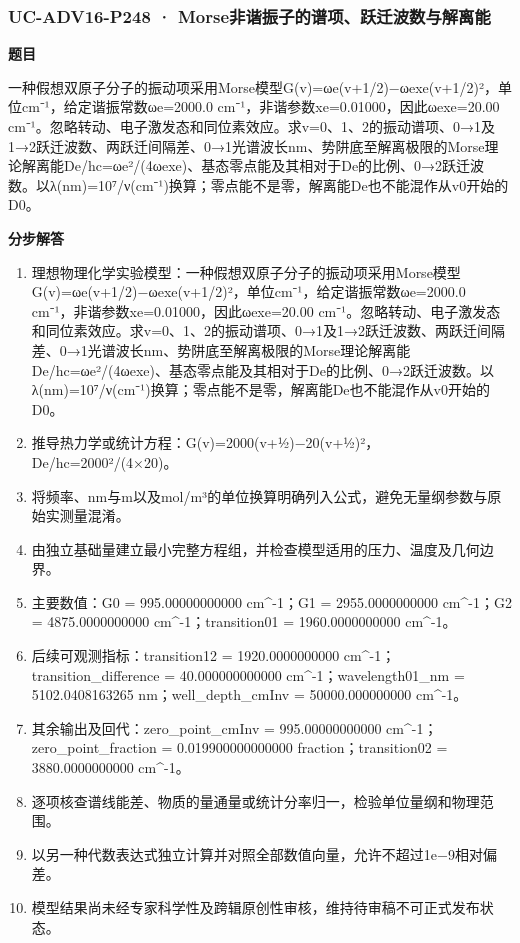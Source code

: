 \documentclass[UTF8,11pt,a4paper]{ctexart}
\begin{document}
\subsubsection*{UC-ADV16-P248 · Morse非谐振子的谱项、跃迁波数与解离能}
\noindent\textbf{题目}\par
一种假想双原子分子的振动项采用Morse模型G(v)=ωe(v+1/2)−ωexe(v+1/2)²，单位cm⁻¹，给定谐振常数ωe=2000.0 cm⁻¹，非谐参数xe=0.01000，因此ωexe=20.00 cm⁻¹。忽略转动、电子激发态和同位素效应。求v=0、1、2的振动谱项、0→1及1→2跃迁波数、两跃迁间隔差、0→1光谱波长nm、势阱底至解离极限的Morse理论解离能De/hc=ωe²/(4ωexe)、基态零点能及其相对于De的比例、0→2跃迁波数。以λ(nm)=10⁷/ν(cm⁻¹)换算；零点能不是零，解离能De也不能混作从v0开始的D0。\par
\medskip\noindent\textbf{分步解答}
\begin{enumerate}
\item 理想物理化学实验模型：一种假想双原子分子的振动项采用Morse模型G(v)=ωe(v+1/2)−ωexe(v+1/2)²，单位cm⁻¹，给定谐振常数ωe=2000.0 cm⁻¹，非谐参数xe=0.01000，因此ωexe=20.00 cm⁻¹。忽略转动、电子激发态和同位素效应。求v=0、1、2的振动谱项、0→1及1→2跃迁波数、两跃迁间隔差、0→1光谱波长nm、势阱底至解离极限的Morse理论解离能De/hc=ωe²/(4ωexe)、基态零点能及其相对于De的比例、0→2跃迁波数。以λ(nm)=10⁷/ν(cm⁻¹)换算；零点能不是零，解离能De也不能混作从v0开始的D0。
\item 推导热力学或统计方程：G(v)=2000(v+½)−20(v+½)²，De/hc=2000²/(4×20)。
\item 将频率、nm与m以及mol/m³的单位换算明确列入公式，避免无量纲参数与原始实测量混淆。
\item 由独立基础量建立最小完整方程组，并检查模型适用的压力、温度及几何边界。
\item 主要数值：G0 = 995.00000000000 cm\textasciicircum{}-1；G1 = 2955.0000000000 cm\textasciicircum{}-1；G2 = 4875.0000000000 cm\textasciicircum{}-1；transition01 = 1960.0000000000 cm\textasciicircum{}-1。
\item 后续可观测指标：transition12 = 1920.0000000000 cm\textasciicircum{}-1；transition\_difference = 40.000000000000 cm\textasciicircum{}-1；wavelength01\_nm = 5102.0408163265 nm；well\_depth\_cmInv = 50000.000000000 cm\textasciicircum{}-1。
\item 其余输出及回代：zero\_point\_cmInv = 995.00000000000 cm\textasciicircum{}-1；zero\_point\_fraction = 0.019900000000000 fraction；transition02 = 3880.0000000000 cm\textasciicircum{}-1。
\item 逐项核查谱线能差、物质的量通量或统计分率归一，检验单位量纲和物理范围。
\item 以另一种代数表达式独立计算并对照全部数值向量，允许不超过1e−9相对偏差。
\item 模型结果尚未经专家科学性及跨辑原创性审核，维持待审稿不可正式发布状态。
\end{enumerate}
\end{document}
